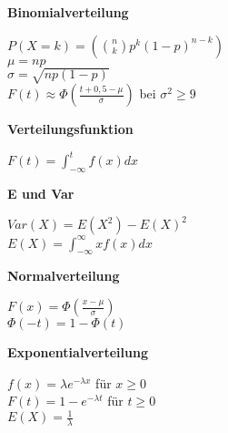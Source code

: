 \documentclass[10pt,twocolumn,a4paper]{article}
\begin{document}
\begin{flushleft}

\textbf{Binomialverteilung}

$P(X=k) = (\binom{n}{k}p^k(1-p)^{n-k})$\\
$\mu = np$\\
$\sigma = \sqrt{np(1-p)}$\\
$F(t) \approx \Phi(\frac{t+0,5-\mu}{\sigma})$ bei $\sigma^2 \geq 9$

\textbf{Verteilungsfunktion}

$F(t) = \int_{-\infty}^t f(x) dx$

\textbf{E und Var}

$Var(X) = E(X^2) - E(X)^2$\\
$E(X) = \int_{-\infty}^{\infty} xf(x) dx$

\textbf{Normalverteilung}

$F(x) = \Phi(\frac{x-\mu}{\sigma})$\\
$\Phi(-t) = 1-\Phi(t)$

\textbf{Exponentialverteilung}

$f(x) = \lambda e^{-\lambda x}$ für $x \geq 0$\\
$F(t) = 1-e^{-\lambda t}$ für $t \geq 0$\\
$E(X) = \frac{1}{\lambda}$\\



\end{flushleft}
\end{document}
